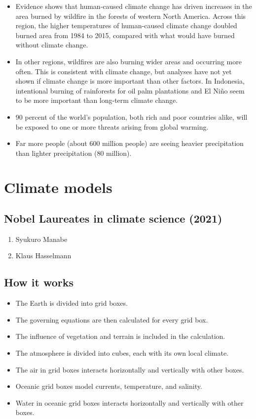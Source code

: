 \documentclass[11pt]{article}
\begin{document}
\newpage

\begin{itemize}
\item Evidence shows that human-caused climate change has driven increases in the area burned by wildfire in the forests of western North America. Across this region, the higher temperatures of human-caused climate change doubled burned area from 1984 to 2015, compared with what would have burned without climate change.
\item In other regions, wildfires are also burning wider areas and occurring more often. This is consistent with climate change, but analyses have not yet shown if climate change is more important than other factors. In Indonesia, intentional burning of rainforests for oil palm plantations and El Niño seem to be more important than long-term climate change.
\item 90 percent of the world's population, both rich and poor countries alike, will be exposed to one or more threats arising from global warming.
\item Far more people (about 600 million people) are seeing heavier precipitation than lighter precipitation (80 million).
\end{itemize}

\newpage
\section{Climate models}
\label{sec:org46154af}

\subsection{Nobel Laureates in climate science (2021)}
\label{sec:org40c86b8}
\begin{enumerate}
\item Syukuro Manabe
\item Klaus Hasselmann
\end{enumerate}
\subsection{How it works}
\label{sec:org5869260}
\begin{itemize}
\item The Earth is divided into grid boxes.
\item The governing equations are then calculated for every grid box.
\item The influence of vegetation and terrain is included in the calculation.
\item The atmosphere is divided into cubes, each with its own local climate.
\item The air in grid boxes interacts horizontally and vertically with other boxes.
\item Oceanic grid boxes model currents, temperature, and salinity.
\item Water in oceanic grid boxes interacts horizontally and vertically with other boxes.
\end{itemize}
\end{document}
